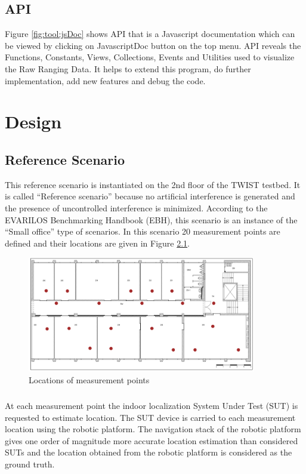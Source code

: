 \documentclass[11pt,a4paper,headinclude,footinclude,chapterprefix=on]{scrreprt}
\begin{document}
\section{API} Figure \ref{fig:tool:jsDoc} shows API that is a Javascript documentation which can be viewed by clicking on JavascriptDoc button on the top menu. API reveals the Functions, Constants, Views, Collections, Events and Utilities used to visualize the Raw Ranging Data. It helps to extend this program, do further implementation, add new features and debug the code. 

\chapter{Design} 
\section{Reference Scenario} This reference scenario is instantiated on the 2nd floor of the TWIST testbed. It is called “Reference scenario” because no artificial interference is generated and the presence of uncontrolled interference is minimized. According to the EVARILOS Benchmarking Handbook (EBH), this scenario is an instance of the “Small office” type of scenarios. In this scenario 20 measurement points are defined and their locations are given in Figure \ref{fig:floor}. 
\begin{figure}
	[!h] \centering 
	\includegraphics[width=100mm]{Images/floor} \caption{Locations of measurement points} \label{fig:floor} 
\end{figure}

\paragraph{} At each measurement point the indoor localization System Under Test (SUT) is requested to estimate location. The SUT device is carried to each measurement location using the robotic platform. The navigation stack of the robotic platform gives one order of magnitude more accurate location estimation than considered SUTs and the location obtained from the robotic platform is considered as the ground truth.
\end{document}
